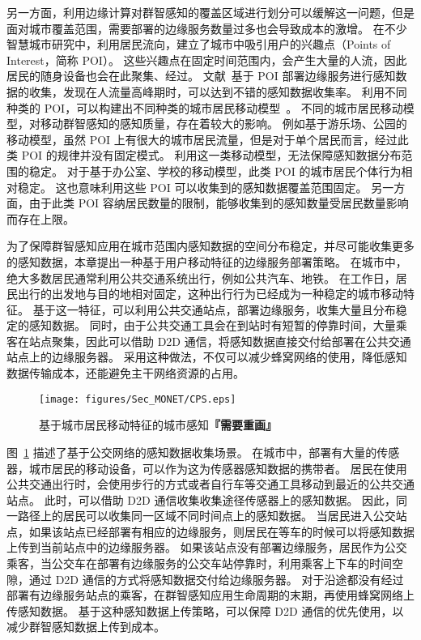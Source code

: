 另一方面，利用边缘计算对群智感知的覆盖区域进行划分可以缓解这一问题，但是面对城市覆盖范围，需要部署的边缘服务数量过多也会导致成本的激增。
在不少智慧城市研究中，利用居民流向，建立了城市中吸引用户的兴趣点（Points of Interest，简称 POI）。
这些兴趣点在固定时间范围内，会产生大量的人流，因此居民的随身设备也会在此聚集、经过。
文献~\cite{DBLP:journals/iotj/ZhanXZW18}基于 POI 部署边缘服务进行感知数据的收集，发现在人流量高峰期时，可以达到不错的感知数据收集率。
利用不同种类的 POI，可以构建出不同种类的城市居民移动模型~\cite{CNKI:XiongOMCS}。
不同的城市居民移动模型，对移动群智感知的感知质量，存在着较大的影响。
例如基于游乐场、公园的移动模型，虽然 POI 上有很大的城市居民流量，但是对于单个居民而言，经过此类 POI 的规律并没有固定模式。
利用这一类移动模型，无法保障感知数据分布范围的稳定。
对于基于办公室、学校的移动模型，此类 POI 的城市居民个体行为相对稳定。
这也意味利用这些 POI 可以收集到的感知数据覆盖范围固定。
另一方面，由于此类 POI 容纳居民数量的限制，能够收集到的感知数量受居民数量影响而存在上限。

为了保障群智感知应用在城市范围内感知数据的空间分布稳定，并尽可能收集更多的感知数据，本章提出一种基于用户移动特征的边缘服务部署策略。
在城市中，绝大多数居民通常利用公共交通系统出行，例如公共汽车、地铁。
在工作日，居民出行的出发地与目的地相对固定，这种出行行为已经成为一种稳定的城市移动特征。
基于这一特征，可以利用公共交通站点，部署边缘服务，收集大量且分布稳定的感知数据。
同时，由于公共交通工具会在到站时有短暂的停靠时间，大量乘客在站点聚集，因此可以借助 D2D 通信，将感知数据直接交付给部署在公共交通站点上的边缘服务器。
采用这种做法，不仅可以减少蜂窝网络的使用，降低感知数据传输成本，还能避免主干网络资源的占用。


\begin{figure}[!h]
\centering
\texttt{[image: figures/Sec\_MONET/CPS.eps]}
\vspace{-0.5em}
\caption{基于城市居民移动特征的城市感知\textbf{『需要重画』}}
\label{Figure_edge}
\end{figure}

图~\ref{Figure_edge} 描述了基于公交网络的感知数据收集场景。
在城市中，部署有大量的传感器，城市居民的移动设备，可以作为这为传感器感知数据的携带者。
居民在使用公共交通出行时，会使用步行的方式或者自行车等交通工具移动到最近的公共交通站点。
此时，可以借助 D2D 通信收集收集途径传感器上的感知数据。
因此，同一路径上的居民可以收集同一区域不同时间点上的感知数据。
当居民进入公交站点，如果该站点已经部署有相应的边缘服务，则居民在等车的时候可以将感知数据上传到当前站点中的边缘服务器。
如果该站点没有部署边缘服务，居民作为公交乘客，当公交车在部署有边缘服务的公交车站停靠时，利用乘客上下车的时间空隙，通过 D2D 通信的方式将感知数据交付给边缘服务器。
对于沿途都没有经过部署有边缘服务站点的乘客，在群智感知应用生命周期的末期，再使用蜂窝网络上传感知数据。
基于这种感知数据上传策略，可以保障 D2D 通信的优先使用，以减少群智感知数据上传到成本。

